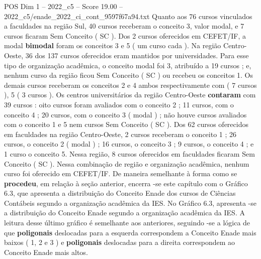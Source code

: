 \begin{textsample}{POS Dim 1 – 2022\_c5 – Score 19.00 – 2022\_c5/enade\_2022\_ci\_cont\_9597f67a94.txt}
Quanto aos 76 cursos vinculados a faculdades na região Sul, 40 cursos receberam o conceito 3, valor modal, e 7 cursos ficaram Sem Conceito ( SC ).
Dos 2 cursos oferecidos em CEFET/IF, a modal \textbf{bimodal} foram os conceitos 3 e 5 ( um curso cada ).
Na região Centro-Oeste, 36 dos 137 cursos oferecidos eram mantidos por universidades.
Para esse tipo de organização acadêmica, o conceito modal foi 3, atribuído a 19 cursos ; e, nenhum curso da região ficou Sem Conceito ( SC ) ou recebeu os conceitos 1.
Os demais cursos receberam os conceitos 2 e 4 ambos respectivamente com ( 7 cursos ), 5 ( 3 cursos ).
Os centros universitários da região Centro-Oeste \textbf{contaram} com 39 cursos : oito cursos foram avaliados com o conceito 2 ; 11 cursos, com o conceito 4 ; 20 cursos, com o conceito 3 ( modal ) ; não houve cursos avaliados com o conceito 1 e 5 nem cursos Sem Conceito ( SC ).
Dos 62 cursos oferecidos em faculdades na região Centro-Oeste, 2 cursos receberam o conceito 1 ; 26 cursos, o conceito 2 ( modal ) ; 16 cursos, o conceito 3 ; 9 cursos, o conceito 4 ; e 1 curso o conceito 5.
Nessa região, 8 cursos oferecidos em faculdades ficaram Sem Conceito ( SC ).
Nessa combinação de região e organização acadêmica, nenhum curso foi oferecido em CEFET/IF.
De maneira semelhante à forma como se \textbf{procedeu}, em relação à seção anterior, encerra -se este capítulo com o Gráfico 6.3, que apresenta a distribuição do Conceito Enade dos cursos de Ciências Contábeis segundo a organização acadêmica da IES.
No Gráfico 6.3, apresenta -se a distribuição do Conceito Enade segundo a organização acadêmica da IES.
A leitura desse último gráfico é semelhante aos anteriores, seguindo -se a lógica de que \textbf{poligonais} deslocadas para a esquerda correspondem a Conceito Enade mais baixos ( 1, 2 e 3 ) e \textbf{poligonais} deslocadas para a direita correspondem ao Conceito Enade mais altos.

\end{textsample}
